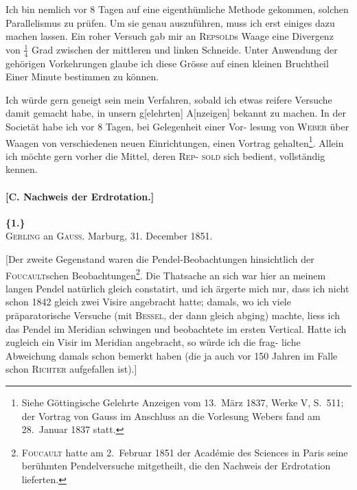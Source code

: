 \documentclass[12pt,a4paper]{article}
\theoremstyle{plain}
\theoremstyle{definition}
\theoremstyle{remark}
\begin{document}
Ich bin nemlich vor 8 Tagen auf eine eigenth\"umliche Methode gekommen,
solchen Parallelismus zu pr\"ufen. Um sie genau auszuf\"uhren, muss ich erst
einiges dazu machen lassen. Ein roher Versuch gab mir an \textsc{Repsold}s
Waage eine Divergenz von $\frac{1}{4}$ Grad zwischen der mittleren und linken Schneide.
Unter Anwendung der geh\"origen Vorkehrungen glaube ich diese Gr\"osse auf
einen kleinen Bruchtheil Einer Minute bestimmen zu k\"onnen.

Ich w\"urde gern geneigt sein mein Verfahren, sobald ich etwas reifere
Versuche damit gemacht habe, in unsern g[elehrten] A[nzeigen] bekannt zu
machen. In der Societ\"at habe ich vor 8 Tagen, bei Gelegenheit einer Vor-
lesung von \textsc{Weber} \"uber Waagen von verschiedenen neuen Einrichtungen, einen
Vortrag gehalten\footnote{Siehe G\"ottingische Gelehrte Anzeigen vom 13.~M\"arz 1837, Werke V, S.~511;
der Vortrag von Gauss im Anschluss an die Vorlesung Webers fand am 28.~Januar 1837 statt.}. Allein ich m\"ochte gern vorher die Mittel, deren \textsc{Rep}-
\textsc{sold} sich bedient, vollst\"andig kennen.

\newpage


\paragraph*{[C. Nachweis der Erdrotation.]}

\vspace{0.5cm}

\noindent\textbf{\{1.\}}\\
\textsc{Gerling} an \textsc{Gauss}. Marburg, 31. December 1851.

\vspace{0.3cm}

[Der zweite Gegenstand waren die Pendel-Beobachtungen hinsichtlich der
\textsc{Foucault}schen Beobachtungen\footnote{\textsc{Foucault} hatte am 2.~Februar 1851 der Acad\'emie des Sciences in Paris seine ber\"uhmten Pendelversuche mitgetheilt, die den Nachweis der Erdrotation lieferten.}. Die Thatsache an sich war hier an meinem
langen Pendel nat\"urlich gleich constatirt, und ich \"argerte mich nur, dass ich
nicht schon 1842 gleich zwei Visire angebracht hatte; damals, wo ich viele
pr\"aparatorische Versuche (mit \textsc{Bessel}, der dann gleich abging) machte, liess
ich das Pendel im Meridian schwingen und beobachtete im ersten Vertical.
Hatte ich zugleich ein Visir im Meridian angebracht, so w\"urde ich die frag-
liche Abweichung damals schon bemerkt haben (die ja auch vor 150 Jahren
im Falle schon \textsc{Richter} aufgefallen ist).]
\end{document}
